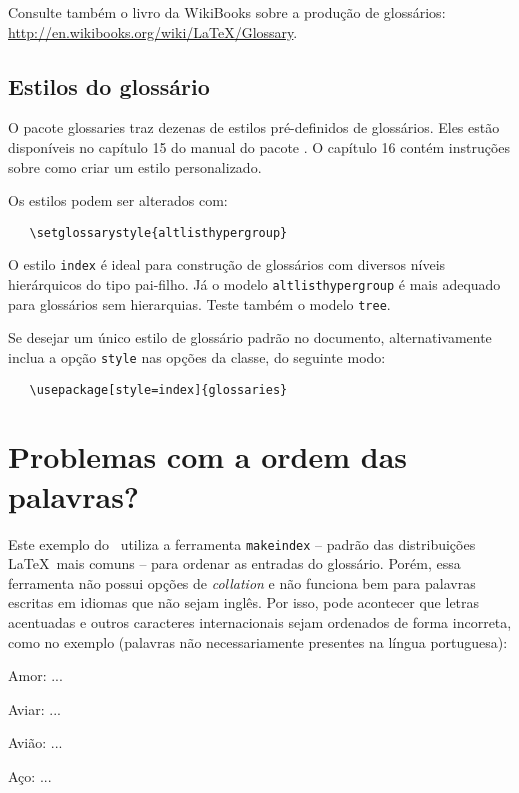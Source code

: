 Consulte também o livro da WikiBooks sobre a produção de glossários:
\url{http://en.wikibooks.org/wiki/LaTeX/Glossary}.


\subsection{Estilos do glossário}

O pacote \textsf{glossaries} traz dezenas de estilos pré-definidos de
glossários. Eles estão disponíveis no capítulo 15 do manual do pacote
\cite{talbot2012}. O capítulo 16 contém instruções sobre como criar um estilo
personalizado.

Os estilos podem ser alterados com:

\begin{verbatim}
   \setglossarystyle{altlisthypergroup}
\end{verbatim}

O estilo \texttt{index} é ideal para construção de glossários com diversos
níveis hierárquicos do tipo pai-filho. Já o modelo \texttt{altlisthypergroup} é
mais adequado para glossários sem hierarquias. Teste também o modelo
\texttt{tree}.

Se desejar um único estilo de glossário padrão no documento, alternativamente
inclua a opção \texttt{style} nas opções da classe, do
seguinte modo:

\begin{verbatim}
   \usepackage[style=index]{glossaries}
\end{verbatim}

\section{Problemas com a ordem das palavras?}

Este exemplo do \abnTeX\ utiliza a ferramenta \texttt{makeindex} -- padrão das
distribuições \LaTeX\ mais comuns -- para ordenar as entradas do glossário.
Porém, essa ferramenta não possui opções de \textit{collation} e não funciona
bem para palavras escritas em idiomas que não sejam inglês.
Por isso, pode acontecer que letras acentuadas e outros caracteres
internacionais sejam ordenados de forma incorreta, como no exemplo (palavras não
necessariamente presentes na língua portuguesa):

\begin{alineas}
 \item Amor: ...
 \item Aviar: ...
 \item Avião: ...
 \item Aço: ...
\end{alineas}

